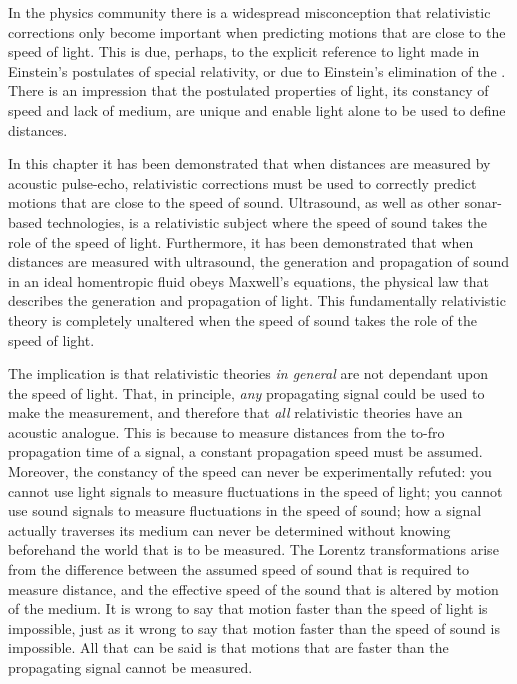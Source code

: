 In the physics community there is a widespread misconception that
relativistic corrections only become important  when predicting  motions that are close to the speed of light.
This is  due, perhaps, to the explicit reference to light made in Einstein's postulates of special relativity,
or due to Einstein's elimination of the \aether.
There is an impression that the postulated properties of light, its  constancy of speed and lack of medium,
are unique
and 
enable light alone to be used to define  distances.




In this chapter it has been demonstrated that
 when distances are measured by acoustic pulse-echo, %
 relativistic corrections must be used to correctly predict motions that  are close to the speed of sound.
Ultrasound, as well as other sonar-based technologies, is  a relativistic subject
where  the  speed of sound takes the role of the speed of light.
Furthermore, it has been demonstrated that  when distances are measured with ultrasound, %
the generation and propagation of sound in an ideal homentropic fluid
obeys  Maxwell's equations, the  physical law that describes the generation and propagation of light.
This  fundamentally relativistic theory is completely unaltered when the speed of sound takes the role of the speed of light.

The implication is that relativistic theories {\em in general} are not dependant upon the speed of light.
That, in principle, {\em any} propagating signal could be used to make the measurement,
and therefore that  {\em all} relativistic theories have an acoustic analogue.
This is because to measure distances from the to-fro propagation time of a signal, 
a constant propagation speed must be assumed.
Moreover, the constancy of the speed can never be experimentally refuted: you cannot use light signals to measure fluctuations in the speed of light;
you cannot use sound signals to measure fluctuations in the speed of sound;
how a signal  actually traverses its medium can never be determined without knowing beforehand the world that is to be measured.
The Lorentz transformations arise from the difference between the assumed speed of sound that is required to measure distance,
and the effective speed of the sound that is altered by motion of the  medium.
It is  wrong to say that motion faster than the speed of light is impossible,
just as it wrong  to say that motion faster than the speed of sound is impossible.
All that can be said is that motions that are faster than the  propagating signal cannot be measured.

